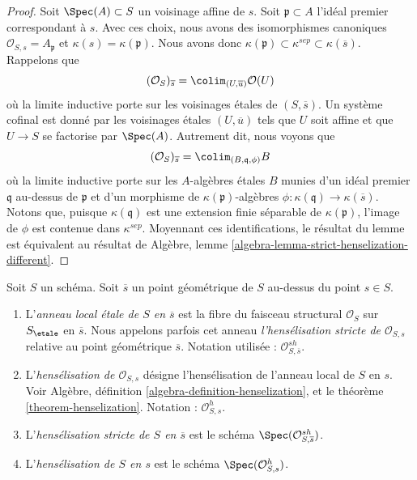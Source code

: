 \begin{proof}
Soit $\Spec(A) \subset S$ un voisinage affine de $s$.
Soit $\mathfrak p \subset A$ l'id\'eal premier correspondant \`a $s$.
Avec ces choix, nous avons des isomorphismes canoniques
$\mathcal{O}_{S, s} = A_{\mathfrak p}$ et $\kappa(s) = \kappa(\mathfrak p)$.
Nous avons donc
$\kappa(\mathfrak p) \subset \kappa^{sep} \subset \kappa(\overline{s})$.
Rappelons que
$$
(\mathcal{O}_S)_{\overline{s}} =
\colim_{(U, \overline{u})} \mathcal{O}(U)
$$
o\`u la limite inductive porte sur les voisinages \'etales de $(S, \overline{s})$.
Un syst\`eme cofinal est donn\'e par les voisinages \'etales $(U, \overline{u})$
tels que $U$ soit affine et que $U \to S$ se factorise par $\Spec(A)$.
Autrement dit, nous voyons que
$$
(\mathcal{O}_S)_{\overline{s}} = \colim_{(B, \mathfrak q, \phi)} B
$$
o\`u la limite inductive porte sur les $A$-alg\`ebres \'etales $B$ munies d'un id\'eal premier
$\mathfrak q$ au-dessus de $\mathfrak p$ et d'un
morphisme de $\kappa(\mathfrak p)$-alg\`ebres
$\phi : \kappa(\mathfrak q) \to \kappa(\overline{s})$.
Notons que, puisque $\kappa(\mathfrak q)$ est une extension finie s\'eparable de
$\kappa(\mathfrak p)$, l'image de $\phi$ est contenue dans $\kappa^{sep}$.
Moyennant ces identifications, le r\'esultat du lemme est \'equivalent
au r\'esultat de
Algèbre, lemme \ref{algebra-lemma-strict-henselization-different}.
\end{proof}

\begin{definition}
\label{definition-etale-local-rings}
Soit $S$ un sch\'ema. Soit $\overline{s}$ un point g\'eom\'etrique de $S$
au-dessus du point $s \in S$.
\begin{enumerate}
\item L'{\it anneau local \'etale de $S$ en $\overline{s}$}
est la fibre du faisceau structural $\mathcal{O}_S$ sur $S_\etale$
en $\overline{s}$. Nous appelons parfois cet anneau
{\it l'hens\'elisation stricte de $\mathcal{O}_{S, s}$} relative
au point g\'eom\'etrique $\overline{s}$.
Notation utilis\'ee : $\mathcal{O}_{S, \overline{s}}^{sh}$.
\item L'{\it hens\'elisation de $\mathcal{O}_{S, s}$} d\'esigne
l'hens\'elisation de l'anneau local de $S$ en $s$. Voir
Algèbre, définition \ref{algebra-definition-henselization},
et le
th\'eor\`eme \ref{theorem-henselization}.
Notation : $\mathcal{O}_{S, s}^h$.
\item L'{\it hens\'elisation stricte de $S$ en $\overline{s}$}
est le sch\'ema $\Spec(\mathcal{O}_{S, \overline{s}}^{sh})$.
\item L'{\it hens\'elisation de $S$ en $s$} est le sch\'ema
$\Spec(\mathcal{O}_{S, s}^h)$.
\end{enumerate}
\end{definition}

